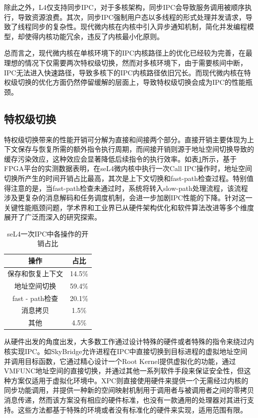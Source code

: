 除此之外，L4仅支持同步IPC，对于多核架构，同步IPC会导致服务调用被顺序执行，导致资源浪费。其次，同步IPC强制用户态以多线程的形式处理并发请求，导致了线程同步的复杂性。现代微内核在内核中引入异步通知机制，简化并发编程模型，却使得内核功能冗余，违反了内核最小化原则。

总而言之，现代微内核在单核环境下的IPC内核路径上的优化已经较为完善，在最理想的情况下仅需要两次特权级切换，然而对多核环境下，由于需要核间中断，IPC无法进入快速路径，导致多核下的IPC内核路径依旧冗长。而现代微内核在特权级切换的优化方面仍然停留缓解的层面上，导致特权级切换会成为IPC的性能瓶颈。

\subsection{特权级切换}
特权级切换带来的性能开销可分解为直接和间接两个部分。直接开销主要体现为上下文保存与恢复所需的额外指令执行周期，而间接开销则源于地址空间切换导致的缓存污染效应，这种效应会显著降低后续指令的执行效率。如表\ref{tab:seL4_call_cost}所示，基于FPGA平台的实测数据表明，在seL4微内核中执行一次Call IPC操作时，地址空间切换所产生的时间开销占比最高，其次是上下文切换和fast-path检查过程。特别值得注意的是，当fast-path检查未通过时，系统将转入slow-path处理流程，该流程涉及更复杂的消息解码和任务调度机制，会进一步加剧IPC性能的下降。针对这一关键性能瓶颈问题，学术界和工业界已从硬件架构优化和软件算法改进等多个维度展开了广泛而深入的研究探索。
\begin{table}
    \centering
    \begin{tabular}{|c|c|}
        \hline 
        操作 & 占比 \\
        \hline
        保存和恢复上下文 & 14.5\% \\
        \hline
        地址空间切换 & 59.4\% \\
        \hline
        fast - path检查 & 20.1\% \\
        \hline
        消息拷贝 & 1.5\% \\
        \hline
        其他 & 4.5\% \\
        \hline
    \end{tabular}
    \caption{seL4一次IPC中各操作的开销占比}
    \label{tab:seL4_call_cost}
\end{table}
    
从硬件出发的角度出发，大多数工作通过设计特殊的硬件或者特殊的指令来绕过内核实现IPC。如SkyBridge\cite{mi2019skybridge}允许进程在IPC中直接切换到目标进程的虚拟地址空间并调用目标函数，它通过精心设计一个Root Kernel提供虚拟化的功能，通过VMFUNC地址空间的直接切换，并通过其他一系列软件手段来保证安全性，但这种方案仅适用于虚拟化环境中。XPC\cite{du2019xpc}则直接使用硬件来提供一个无需经过内核的同步功能调用，并提供一种新的空间映射机制用于调用者与被调用者之间的零拷贝消息传递，然而该方案没有相应的硬件标准，也没有一款通用的处理器对其进行支持。这些方法都基于特殊的环境或者没有标准化的硬件来实现，适用范围有限。

